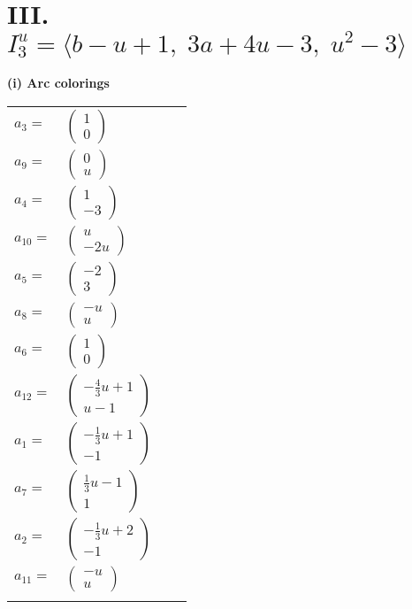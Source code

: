 \documentclass[1p]{elsarticle_modified}
\theoremstyle{definition}
\begin{document}
\centering \section*{III. $I^u_{3}= \langle b- u+1,\;3 a+4 u-3,\;u^2-3 \rangle$}
\flushleft \textbf{(i) Arc colorings}\\
\begin{tabular}{m{7pt} m{180pt} m{7pt} m{180pt} }
\flushright $a_{3}=$&$\begin{pmatrix}1\\0\end{pmatrix}$ \\
\flushright $a_{9}=$&$\begin{pmatrix}0\\u\end{pmatrix}$ \\
\flushright $a_{4}=$&$\begin{pmatrix}1\\-3\end{pmatrix}$ \\
\flushright $a_{10}=$&$\begin{pmatrix}u\\-2 u\end{pmatrix}$ \\
\flushright $a_{5}=$&$\begin{pmatrix}-2\\3\end{pmatrix}$ \\
\flushright $a_{8}=$&$\begin{pmatrix}- u\\u\end{pmatrix}$ \\
\flushright $a_{6}=$&$\begin{pmatrix}1\\0\end{pmatrix}$ \\
\flushright $a_{12}=$&$\begin{pmatrix}-\frac{4}{3} u+1\\u-1\end{pmatrix}$ \\
\flushright $a_{1}=$&$\begin{pmatrix}-\frac{1}{3} u+1\\-1\end{pmatrix}$ \\
\flushright $a_{7}=$&$\begin{pmatrix}\frac{1}{3} u-1\\1\end{pmatrix}$ \\
\flushright $a_{2}=$&$\begin{pmatrix}-\frac{1}{3} u+2\\-1\end{pmatrix}$ \\
\flushright $a_{11}=$&$\begin{pmatrix}- u\\u\end{pmatrix}$\\&\end{tabular}
\end{document}
